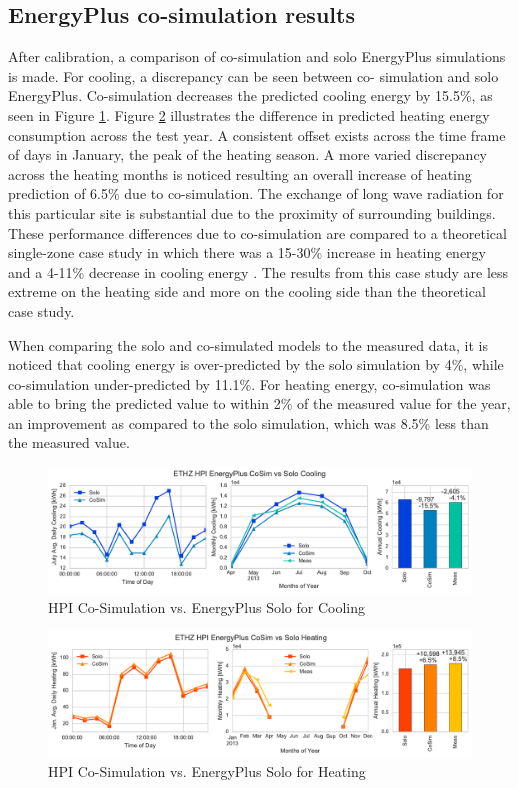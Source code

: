 \documentclass{tBPS2e}
\theoremstyle{plain}
\theoremstyle{definition}
\theoremstyle{remark}
\begin{document}
\subsection{EnergyPlus co-simulation results}
After calibration, a comparison of co-simulation and solo EnergyPlus
simulations is made. For cooling, a discrepancy can be seen between co-
simulation and solo EnergyPlus. Co-simulation decreases the predicted cooling energy by 15.5\%, as seen in Figure
\ref{fig:hpi_energypluscooling}. Figure \ref{fig:hpi_energyplusheating}
illustrates the difference in predicted heating energy consumption across the
test year. A consistent offset exists across the time frame of days in
January, the peak of the heating season. A more varied discrepancy across the
heating months is noticed resulting an overall increase of heating prediction
of 6.5\% due to co-simulation. The exchange of long wave radiation for this
particular site is substantial due to the proximity of surrounding buildings.
These performance differences due to co-simulation are compared to a
theoretical single-zone case study in which there was a 15-30\% increase in
heating energy and a 4-11\% decrease in cooling energy \citep{Miller:2015vk}.
The results from this case study are less extreme on the heating side and more
on the cooling side than the theoretical case study. 

When comparing the solo and co-simulated models to the measured data, it is noticed that 
cooling energy is over-predicted by the solo simulation by 4\%, while co-simulation under-predicted 
by 11.1\%. For heating energy, co-simulation was able to bring the predicted value to within 2\% of 
the measured value for the year, an improvement as compared to the solo simulation, which was 8.5\% less than the measured value.


\begin{figure}[H]
\centering
\includegraphics[scale=0.55]{figures/HPI_EnergyPlus_Cooling}
\caption{HPI Co-Simulation vs. EnergyPlus Solo for Cooling}
\label{fig:hpi_energypluscooling}
\end{figure}


\begin{figure}[H]
\centering
\includegraphics[scale=0.55]{figures/HPI_EnergyPlus_Heating}
\caption{HPI Co-Simulation vs. EnergyPlus Solo for Heating}
\label{fig:hpi_energyplusheating}
\end{figure}
\end{document}
